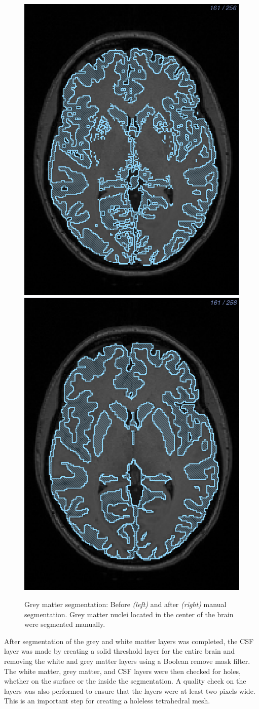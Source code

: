 \begin{figure}[H]
\begin{center}
\includegraphics[width=.49\textwidth]{Figures/greymatter_before_nuclei}
\includegraphics[width=.49\textwidth]{Figures/greymatter_added_nuclei}
\caption{Grey matter segmentation: Before \textit{(left)} and after \textit{(right)} manual segmentation. Grey matter nuclei located in the center of the brain were segmented manually.}
\label{fig:gm}
\end{center}
\end{figure}

After segmentation of the grey and white matter layers was completed, the CSF layer was made by creating a solid threshold layer for the entire brain and removing the white and grey matter layers using a Boolean remove mask filter. The white matter, grey matter, and CSF layers were then checked for holes, whether on the surface or the inside the segmentation. A quality check on the layers was also performed to ensure that the layers were at least two pixels wide. This is an important step for creating a holeless tetrahedral mesh. 

